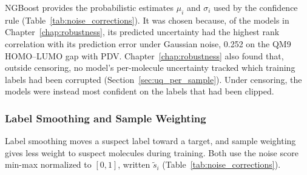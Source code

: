 NGBoost provides the probabilistic estimates $\mu_i$ and $\sigma_i$ used by the confidence rule (Table~\ref{tab:noise_corrections}). It was chosen because, of the models in Chapter~\ref{chap:robustness}, its predicted uncertainty had the highest rank correlation with its prediction error under Gaussian noise, 0.252 on the QM9 HOMO--LUMO gap with PDV. Chapter~\ref{chap:robustness} also found that, outside censoring, no model's per-molecule uncertainty tracked which training labels had been corrupted (Section~\ref{sec:uq_per_sample}). Under censoring, the models were instead most confident on the labels that had been clipped.

\subsubsection{Label Smoothing and Sample Weighting}

Label smoothing moves a suspect label toward a target, and sample weighting gives less weight to suspect molecules during training. Both use the noise score min-max normalized to $[0, 1]$, written $\tilde s_i$ (Table~\ref{tab:noise_corrections}).

